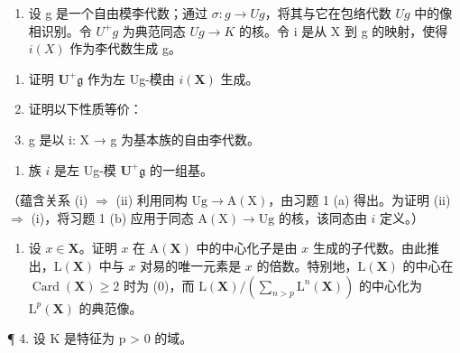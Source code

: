 \begin{enumerate}
\def\labelenumi{\arabic{enumi}.}
\setcounter{enumi}{1}
\tightlist
\item
  设 g 是一个自由模李代数；通过 \(\sigma: g \to Ug\)，将其与它在包络代数 \(Ug\) 中的像相识别。令 \(U^{+}g\) 为典范同态 \(Ug \to K\) 的核。令 i 是从 X 到 g 的映射，使得 \(i(X)\) 作为李代数生成 g。
\end{enumerate}

\begin{enumerate}
\def\labelenumi{(\alph{enumi})}
\item
  证明 \(\mathbf{U}^{+}\mathfrak{g}\) 作为左 Ug-模由 \(i(\mathbf{X})\) 生成。
\item
  证明以下性质等价：
\item
  g 是以 i: X → g 为基本族的自由李代数。
\end{enumerate}

\begin{enumerate}
\def\labelenumi{(\roman{enumi})}
\setcounter{enumi}{1}
\tightlist
\item
  族 \(i\) 是左 Ug-模 \(\mathbf{U}^{+}\mathfrak{g}\) 的一组基。
\end{enumerate}

（蕴含关系 (i) \(\Rightarrow\) (ii) 利用同构 \(\mathrm{Ug} \to \mathrm{A}(\mathrm{X})\)，由习题 1 (a) 得出。为证明 (ii) \(\Rightarrow\) (i)，将习题 1 (b) 应用于同态 \(\mathrm{A}(\mathrm{X}) \to \mathrm{Ug}\) 的核，该同态由 \(i\) 定义。）

\begin{enumerate}
\def\labelenumi{\arabic{enumi}.}
\setcounter{enumi}{2}
\tightlist
\item
  设 \(x \in \mathbf{X}\)。证明 \(x\) 在 \(\mathrm{A}(\mathbf{X})\) 中的中心化子是由 \(x\) 生成的子代数。由此推出，\(\mathrm{L}(\mathbf{X})\) 中与 \(x\) 对易的唯一元素是 \(x\) 的倍数。特别地，\(\mathrm{L}(\mathbf{X})\) 的中心在 \(\operatorname{Card}(\mathbf{X}) \geqslant 2\) 时为 (0)，而 \(\mathrm{L}(\mathbf{X}) / \left( \sum_{n > p} \mathrm{L}^n(\mathbf{X}) \right)\) 的中心化为 \(\mathrm{L}^p(\mathbf{X})\) 的典范像。
\end{enumerate}


¶ 4. 设 K 是特征为 p \textgreater{} 0 的域。

